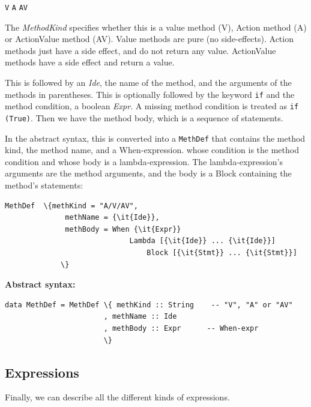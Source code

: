 \documentclass[11pt]{article}
\newcommand{\hm}{\hspace*{1em}}
\newcommand{\nterm}[1]{\emph{#1}}
\newcommand{\term}[1]{\texttt{#1}}
\newcommand{\alt}{{$\mid$}}
\newcommand{\gram}[2]{    \hm\makebox[10em][l]{\it #1}\makebox[1.5em][l]{::=}    #2}
\begin{document}
\gram{MethodKind}{\term{V} \hm \alt \hm \term{A} \hm \alt \hm \term{AV}}

The \nterm{MethodKind} specifies whether this is a value method (V),
Action method (A) or ActionValue method (AV).  Value methods are pure
(no side-effects). Action methods just have a side effect, and do not
return any value. ActionValue methods have a side effect and return a
value.

This is followed by an \nterm{Ide}, the name of the method, and the
arguments of the methods in parentheses. This is optionally followed
by the keyword \term{if} and the method condition, a boolean
\nterm{Expr}. A missing method condition is treated as \verb|if (True)|.
Then we have the method body, which is a sequence of
statements.

In the abstract syntax, this is converted into a \term{MethDef} that
contains the method kind, the method name, and a When-expression.
whose condition is the method condition and whose body is a
lambda-expression.  The lambda-expression's arguments are the method
arguments, and the body is a Block containing the method's statements:

\begin{Verbatim}[frame=single, commandchars=\\\{\}]
    MethDef  \{methKind = "A/V/AV",
              methName = {\it{Ide}},
              methBody = When {\it{Expr}}
                             Lambda [{\it{Ide}} ... {\it{Ide}}]
                                 Block [{\it{Stmt}} ... {\it{Stmt}}]
             \}
\end{Verbatim}


{\bf Abstract syntax:}

\begin{Verbatim}[frame=single, commandchars=\\\{\}]
data MethDef = MethDef \{ methKind :: String    -- "V", "A" or "AV"
                       , methName :: Ide
                       , methBody :: Expr      -- When-expr
                       \}
\end{Verbatim}


\subsection{Expressions}

\label{sec_syntax_expr}

Finally, we can describe all the different kinds of expressions.
\end{document}
